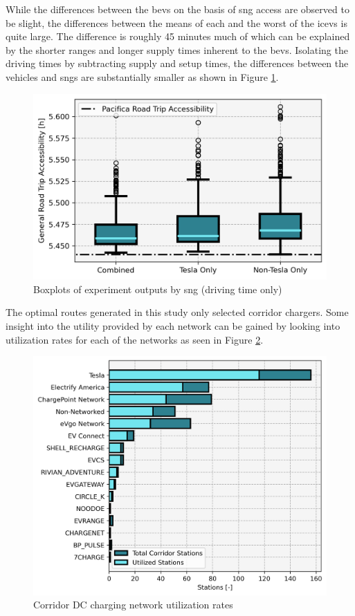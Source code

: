 \documentclass[11pt]{article}
\begin{document}
\begin{multicols}{2}
While the differences between the \glspl{bev} on the basis of \gls{sng} access are observed to be slight, the differences between the means of each and the worst of the \glspl{icev} is quite large. The difference is roughly 45 minutes much of which can be explained by the shorter ranges and longer supply times inherent to the \glspl{bev}. Isolating the driving times by subtracting supply and setup times, the differences between the vehicles and \glspl{sng} are substantially smaller as shown in Figure \ref{fig:networks_boxplots_driving}.

\begin{figure}[H]
	\centering
	\includegraphics[width = \linewidth]{figs/Networks_Boxplots_RTA_D.png}
	\caption{Boxplots of experiment outputs by \gls{sng} (driving time only)}
	\label{fig:networks_boxplots_driving}
\end{figure}

The optimal routes generated in this study only selected corridor chargers. Some insight into the utility provided by each network can be gained by looking into utilization rates for each of the networks as seen in Figure \ref{fig:utilization_rates}.

\begin{figure}[H]
	\centering
	\includegraphics[width = \linewidth]{figs/corridor_station_utilization.png}
	\caption{Corridor DC charging network utilization rates}
	\label{fig:utilization_rates}
\end{figure}



\end{multicols}
\end{document}
